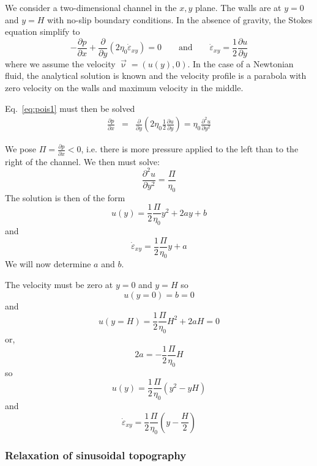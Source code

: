 We consider a two-dimensional channel in the $x,y$ plane. The walls 
are at $y=0$ and $y=H$ with no-slip boundary conditions. 
In the absence of gravity, the Stokes equation simplify to 
\begin{equation}
-\frac{\partial p}{\partial x}  +\frac{\partial }{\partial y} (2\eta_0 \dot{\varepsilon}_{xy}) =0
\qquad
\text{and}
\qquad
\dot{\varepsilon}_{xy} = \frac{1}{2} \frac{\partial u}{\partial y} 
\label{eq:pois1}
\end{equation}
where we assume the velocity $\vec\upnu=(u(y),0)$.
In the case of a Newtonian fluid, the analytical solution is 
known and the velocity profile is a parabola with zero velocity on the
walls and maximum velocity in the middle. 


Eq.~\eqref{eq:pois1} must then be solved 
\begin{eqnarray}
\frac{\partial p}{\partial x}  
&=&\frac{\partial }{\partial y} \left(2\eta_{0}  \frac{1}{2}\frac{\partial u}{\partial y} \right) 
= \eta_0 \frac{\partial^2 u}{\partial y^2}  
\end{eqnarray}

We pose $\Pi=\frac{\partial p}{\partial x}<0$, i.e. 
there is more pressure applied to the left than to the right of the channel.
We then must solve:
\[
\frac{\partial^2 u}{\partial y^2} = \frac{\Pi}{\eta_0} 
\]
The solution is then of the form
\[
u(y) = \frac{1}{2}\frac{\Pi}{\eta_0} y^2 + 2a y + b
\]
and 
\[
\dot{\varepsilon}_{xy}= \frac{1}{2} \frac{\Pi}{\eta_0}y  + a
\]
We will now determine $a$ and $b$.

The velocity must be zero at $y=0$ and $y=H$ so 
\[
u(y=0)=b=0
\] 
and 
\[
u(y=H)=\frac{1}{2}\frac{\Pi}{\eta_0} H^2 + 2a H =0
\]
or, 
\[
2a=-\frac{1}{2}\frac{\Pi}{\eta_0} H
\]
so 
\begin{equation}
\boxed{
u(y) = \frac{1}{2}\frac{\Pi}{\eta_0} (y^2 - y H)
}
\end{equation}
and 
\begin{equation}
\boxed{
\dot{\varepsilon}_{xy}= \frac{1}{2} \frac{\Pi}{\eta_0} \left(y  - \frac{H}{2} \right)
}
\end{equation}
 


 











\subsubsection{Relaxation of sinusoidal topography}

